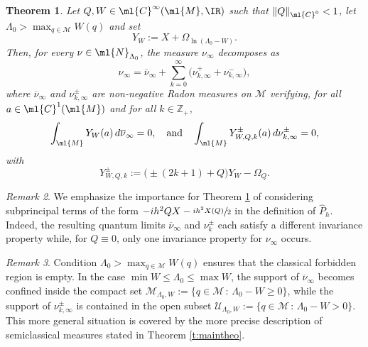 \documentclass[JEP,XML,SOM,Unicode, NoEqCountersInSection,published]{cedram}
\theoremstyle{plain}
\newtheorem{theo}{Theorem}[section]
\theoremstyle{definition}
\theoremstyle{remark}
\newtheorem{rema}[theo]{Remark}
\begin{document}
\begin{theo}
\label{t:simplified_theorem}
Let $Q,W\in\ml{C}^\infty(\ml{M},\IR)$ such that $\|Q\|_{\ml{C}^0}<1$, let $\Lambda_0 > \max_{q \in \mathcal{M}} W(q)$ and set
\begin{equation}\label{e:good-vectorfield}
Y_W:=X+\Omega_{\ln(\Lambda_0-W)}.
\end{equation}
Then, for every $\nu\in\ml{N}_{\Lambda_0}$, the measure $\nu_\infty$ decomposes as
\begin{equation}
\label{e:decomposition_nu}
\nu_\infty = \overline{\nu}_\infty + \sum_{k=0}^\infty \big(\nu^+_{k,\infty} + \nu_{k,\infty}^- \big),
\end{equation}
where $\overline{\nu}_\infty$ and $\nu_{k,\infty}^\pm$ are non-negative Radon measures on $\mathcal{M}$ verifying, for all $a\in\ml{C}^1(\ml{M})$ and for all $k\in\mathbb{Z}_+$,
\begin{equation}\label{e:invariance-base}
\int_{\ml{M}}Y_W(a) \, d\overline{\nu}_\infty=0,\quad\text{and}\quad\int_{\ml{M}}Y_{W,Q,k}^\pm(a) \, d\nu_{k,\infty}^\pm=0,
\end{equation}
with
\[
Y^\pm_{W,Q,k} := \big(\pm (2k + 1) + Q \big) Y_W-\Omega_Q.
\]
\end{theo}

\begin{rema}
\label{remark_type_perturbations} We emphasize the importance for Theorem \ref{t:simplified_theorem} of considering subprincipal terms of the form $-ih^2QX - \sfrac{ih^2X(Q)}{2}$ in the definition of $\widehat{P}_h$. Indeed, the resulting quantum limits $\overline{\nu}_\infty$ and $\nu_k^{\pm}$ each satisfy a different invariance property while, for $Q\equiv 0$, only one invariance property for $\nu_\infty$ occurs.
\end{rema}

\begin{rema}
Condition $\Lambda_0 > \max_{q \in \mathcal{M}} W(q)$ ensures that the classical forbidden region is empty. In the case $\min W \leq \Lambda_0 \leq \max W$, the support of $\overline{\nu}_\infty$ becomes confined inside the compact set $\mathcal{M}_{\Lambda_0,W} := \{ q \in \mathcal{M} \, : \, \Lambda_0 - W \geq 0 \}$, while the support of $\nu_{k,\infty}^\pm$ is contained in the open subset $\mathcal{U}_{\Lambda_0,W}:= \{ q \in \mathcal{M} \, : \, \Lambda_0 - W > 0 \}$. This more general situation is covered by the more precise description of semiclassical measures stated in Theorem \ref{t:maintheo}.
\end{rema}
\end{document}

